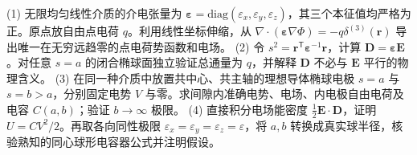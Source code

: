 (1) 无限均匀线性介质的介电张量为 \(\boldsymbol\varepsilon=\mathrm{diag}(\varepsilon_x,\varepsilon_y,\varepsilon_z)\)，其三个本征值均严格为正。原点放自由点电荷 \(q\)。利用线性坐标伸缩，从 \(\nabla\cdot(\boldsymbol\varepsilon\nabla\Phi)=-q\delta^{(3)}(\mathbf r)\) 导出唯一在无穷远趋零的点电荷势函数和电场。
(2) 令 \(s^2=\mathbf r^\mathsf T\boldsymbol\varepsilon^{-1}\mathbf r\)，计算 \(\mathbf D=\boldsymbol\varepsilon\mathbf E\)。对任意 \(s=a\) 的闭合椭球面独立验证总通量为 \(q\)，并解释 \(\mathbf D\) 不必与 \(\mathbf E\) 平行的物理含义。
(3) 在同一种介质中放置共中心、共主轴的理想导体椭球电极 \(s=a\) 与 \(s=b>a\)，分别固定电势 \(V\) 与零。求间隙内准确电势、电场、内电极自由电荷及电容 \(C(a,b)\)；验证 \(b\to\infty\) 极限。
(4) 直接积分电场能密度 \(\tfrac12\mathbf E\cdot\mathbf D\)，证明 \(U=CV^2/2\)。再取各向同性极限 \(\varepsilon_x=\varepsilon_y=\varepsilon_z=\varepsilon\)，将 \(a,b\) 转换成真实球半径，核验熟知的同心球形电容器公式并注明假设。
